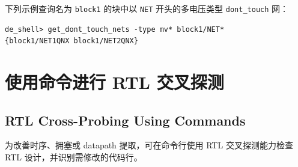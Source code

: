 下列示例查询名为 \texttt{block1} 的块中以 \texttt{NET} 开头的多电压类型 \texttt{dont\_touch} 网：
\begin{lstlisting}
de_shell> get_dont_touch_nets -type mv* block1/NET*
{block1/NET1QNX block1/NET2QNX}
\end{lstlisting}

\section{使用命令进行 RTL 交叉探测}
\subsection*{RTL Cross-Probing Using Commands}

为改善时序、拥塞或 datapath 提取，可在命令行使用 RTL 交叉探测能力检查 RTL 设计，并识别需修改的代码行。


